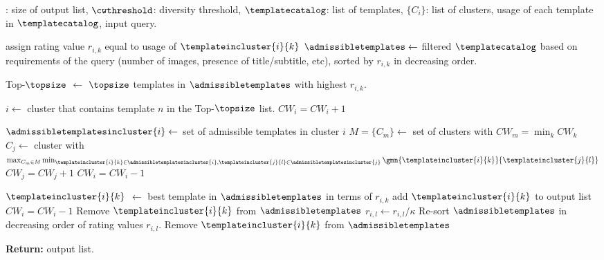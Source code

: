 \begin{algorithm}
\caption{\label{alg:cw}Template Retrieval Framework (\trf) algorithm}
\begin{algorithmic}[1]
\REQUIRE \topsize: size of output list, $\cwthreshold$: diversity threshold, $\templatecatalog$: list of templates, $\{C_i\}$: list of clusters, usage of each template in $\templatecatalog$, input query.

    \STATE assign rating value $r_{i,k}$ equal to usage of $\templateincluster{i}{k}$
\ENDFOR
\STATE $\admissibletemplates \leftarrow$ filtered $\templatecatalog$ based on requirements of the query (number of images, presence of title/subtitle, etc), sorted by $r_{i,k}$ in decreasing order.

\STATE Top-$\topsize$ $\leftarrow$ $\topsize$ templates in $\admissibletemplates$ with highest $r_{i,k}$.

    \STATE $i \leftarrow $ cluster that contains template $n$ in the Top-$\topsize$ list. 
    \STATE $CW_i = CW_i + 1$ 
\ENDFOR

    \STATE $\admissibletemplatesincluster{i} \leftarrow$ set of admissible templates in cluster $i$
        \STATE $M = \{C_m\} \leftarrow$ set of clusters with $CW_m = \min_k CW_k$
        \STATE $C_j \leftarrow $ cluster with $\max_{C_m \in M} \min_{\templateincluster{i}{k} \in \admissibletemplatesincluster{i},\templateincluster{j}{l} \in \admissibletemplatesincluster{j}} \gmn{\templateincluster{i}{k}}{\templateincluster{j}{l}}$
        \STATE $CW_j = CW_j + 1$ 
        \STATE $CW_i = CW_i - 1$ 
    \ENDWHILE
\ENDFOR

    \STATE $\templateincluster{i}{k}$ $\leftarrow$ best template in $\admissibletemplates$ in terms of $r_{i,k}$
        \STATE add $\templateincluster{i}{k}$ to output list
        \STATE $CW_i = CW_i - 1$
        \STATE Remove $\templateincluster{i}{k}$ from $\admissibletemplates$
            \STATE $r_{i,l} \leftarrow r_{i,l} / \kappa$ 
        \ENDFOR
        \STATE Re-sort $\admissibletemplates$ in decreasing order of rating values $r_{i,l}$.
    \ELSE 
        \STATE Remove $\templateincluster{i}{k}$ from $\admissibletemplates$
    \ENDIF
\ENDWHILE

\STATE \textbf{Return:} output list.
\end{algorithmic}
\end{algorithm}


